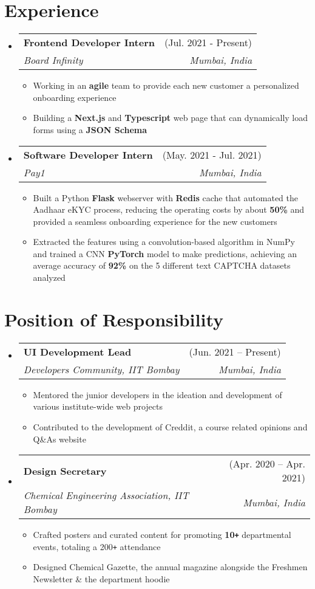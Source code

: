 \documentclass[a4paper,11pt]{article}
\makeatletter
\def\Plus{\texttt{+}}
\newcommand{\resumeItem}[1]{
  \item\small{
    {#1 \vspace{-2pt}}
  }
}
\newcommand{\resumeSubheading}[4]{
  \vspace{-2pt}\item
    \begin{tabular*}{\textwidth}[t]{l@{\extracolsep{\fill}}r}
      \textbf{#1} & #2 \\
      \textit{\small#3} & \textit{\small #4} \\
    \end{tabular*}\vspace{-7pt}
}
\newcommand{\resumeSubHeadingListStart}{\begin{itemize}[leftmargin=-0pt, label={}]}
\newcommand{\resumeSubHeadingListEnd}{\end{itemize}}
\newcommand{\resumeItemListStart}{\begin{itemize}}
\newcommand{\resumeItemListEnd}{\end{itemize}\vspace{-5pt}}
\makeatother
\begin{document}
\section{Experience}
\resumeSubHeadingListStart
  \resumeSubheading
  {Frontend Developer Intern}{(Jul. 2021 - Present)}
  {Board Infinity}{Mumbai, India}
  \resumeItemListStart
    \resumeItem{Working in an \textbf{agile} team to provide each new customer a personalized onboarding experience}
    \resumeItem{Building a \textbf{Next.js} and \textbf{Typescript} web page that can dynamically load forms using a \textbf{JSON Schema}}
  \resumeItemListEnd

  \resumeSubheading
  {Software Developer Intern}{(May. 2021 - Jul. 2021)}
  {Pay1}{Mumbai, India}
  \resumeItemListStart
    \resumeItem{Built a Python \textbf{Flask} webserver with \textbf{Redis} cache that automated the Aadhaar eKYC process, reducing the operating costs by about \textbf{50\%} and provided a seamless onboarding experience for the new customers}
    \resumeItem{Extracted the features using a convolution-based algorithm in NumPy and trained a CNN \textbf{PyTorch} model to make predictions, achieving an average accuracy of \textbf{92\%} on the 5 different text CAPTCHA datasets analyzed}
  \resumeItemListEnd

  \resumeSubHeadingListEnd



\section{Position of Responsibility}
\resumeSubHeadingListStart
  \resumeSubheading
  {UI Development Lead}{(Jun. 2021 -- Present)}
  {Developers Community, IIT Bombay}{Mumbai, India}
  \resumeItemListStart
    \resumeItem{Mentored the junior developers in the ideation and development of various institute-wide web projects}
    \resumeItem{Contributed to the development of Creddit, a course related opinions and Q\&As website}
  \resumeItemListEnd

  \resumeSubheading
  {Design Secretary}{(Apr. 2020 -- Apr. 2021)}
  {Chemical Engineering Association, IIT Bombay}{Mumbai, India}
  \resumeItemListStart
    \resumeItem{Crafted posters and curated content for promoting \textbf{10\Plus} departmental events, totaling a {200\Plus} attendance}
    \resumeItem{Designed Chemical Gazette, the annual magazine alongside the Freshmen Newsletter \& the department hoodie}
  \resumeItemListEnd
\resumeSubHeadingListEnd
\end{document}
